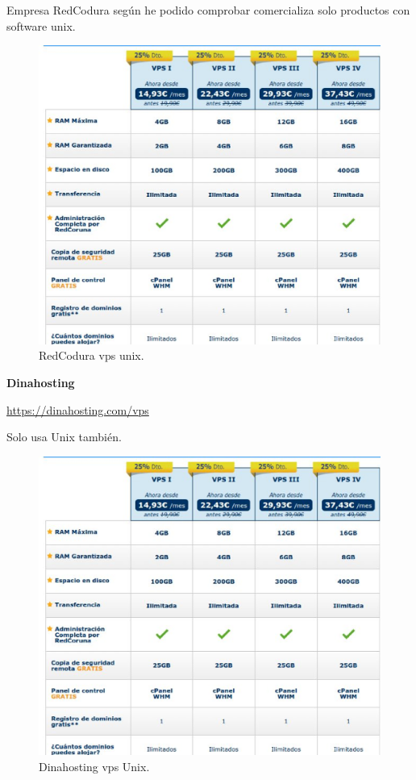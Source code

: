 Empresa RedCodura según he podido comprobar comercializa solo productos con software unix. 
\begin{figure}[H]
\begin{center}
\includegraphics[scale=0.4]{imagenes/cuestion2-3.eps}
\caption{ RedCodura vps unix.}
\end{center}
\end{figure}


\textbf{Dinahosting}

\url{https://dinahosting.com/vps}



Solo usa Unix también.

\begin{figure}[H]
\begin{center}
\includegraphics[scale=0.4]{imagenes/cuestion2-3.eps}
\caption{ Dinahosting vps Unix.}
\end{center}
\end{figure}

